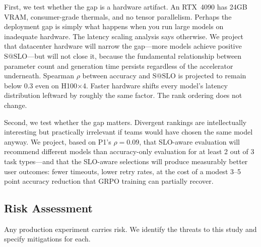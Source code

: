 \documentclass[11pt]{article}
\makeatletter
\newcommand{\sslo}{\ensuremath{\mathrm{S@SLO}}}
\makeatother
\begin{document}
First, we test whether the gap is a hardware artifact. An RTX~4090 has 24GB VRAM, consumer-grade thermals, and no tensor parallelism. Perhaps the deployment gap is simply what happens when you run large models on inadequate hardware. The latency scaling analysis says otherwise. We project that datacenter hardware will narrow the gap---more models achieve positive $\sslo{}$---but will not close it, because the fundamental relationship between parameter count and generation time persists regardless of the accelerator underneath. Spearman $\rho$ between accuracy and $\sslo{}$ is projected to remain below 0.3 even on H100$\times$4. Faster hardware shifts every model's latency distribution leftward by roughly the same factor. The rank ordering does not change.

Second, we test whether the gap matters. Divergent rankings are intellectually interesting but practically irrelevant if teams would have chosen the same model anyway. We project, based on P1's $\rho = 0.09$, that SLO-aware evaluation will recommend different models than accuracy-only evaluation for at least 2 out of 3 task types---and that the SLO-aware selections will produce measurably better user outcomes: fewer timeouts, lower retry rates, at the cost of a modest 3--5 point accuracy reduction that GRPO training can partially recover.

\subsection{Risk Assessment}

Any production experiment carries risk. We identify the threats to this study and specify mitigations for each.
\end{document}
